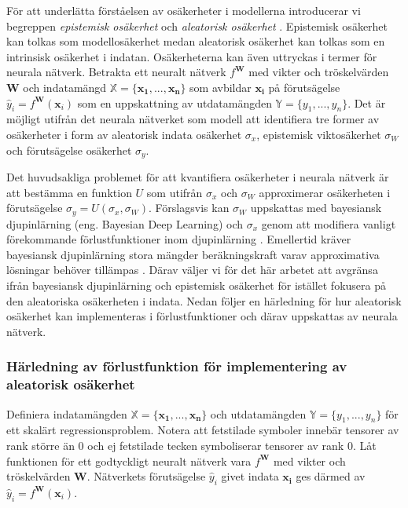 För att underlätta förståelsen av osäkerheter i modellerna introducerar vi begreppen \emph{epistemisk osäkerhet} och \emph{aleatorisk osäkerhet} \cite{Uncert}. Epistemisk osäkerhet kan tolkas som modellosäkerhet medan aleatorisk osäkerhet kan tolkas som en intrinsisk osäkerhet i indatan. Osäkerheterna kan även uttryckas i termer för neurala nätverk. Betrakta ett neuralt nätverk $f^\mathbf{W}$ med vikter och tröskelvärden $\mathbf{W}$ och indatamängd $\mathbb{X} = \{\mathbf{x_1},..., \mathbf{x_n}\}$ som avbildar $\mathbf{x_i}$ på förutsägelse $\hat{y}_i = f^\mathbf{W}(\mathbf{x}_i)$ som en uppskattning av utdatamängden $\mathbb{Y} = \{y_1,..., y_n\}$. Det är möjligt utifrån det neurala nätverket som modell att identifiera tre former av osäkerheter i form av aleatorisk indata osäkerhet $\sigma_x$, epistemisk viktosäkerhet $\sigma_W$ och förutsägelse osäkerhet $\sigma_y$.

Det huvudsakliga problemet för att kvantifiera osäkerheter i neurala nätverk är att bestämma en funktion $U$ som utifrån $\sigma_x$ och $\sigma_W$ approximerar osäkerheten i förutsägelse $\sigma_y = U(\sigma_x, \sigma_W)$. Förslagsvis kan $\sigma_W$ uppskattas med bayesiansk djupinlärning (eng. Bayesian Deep Learning) och $\sigma_x$ genom att modifiera vanligt förekommande förlustfunktioner inom djupinlärning \cite{Kendall-Gal}. Emellertid kräver bayesiansk djupinlärning stora mängder beräkningskraft varav approximativa lösningar behöver tillämpas \cite{MC-dropout}. Därav väljer vi för det här arbetet att avgränsa ifrån bayesiansk djupinlärning och epistemisk osäkerhet för istället fokusera på den aleatoriska osäkerheten i indata. Nedan följer en härledning för hur aleatorisk osäkerhet kan implementeras i förlustfunktioner och därav uppskattas av neurala nätverk.

\subsubsection{Härledning av förlustfunktion för implementering av aleatorisk osäkerhet}
Definiera indatamängden $\mathbb{X} = \{\mathbf{x_1},..., \mathbf{x_n}\}$ och utdatamängden $\mathbb{Y} = \{y_1,..., y_n\}$ för ett skalärt regressionsproblem. Notera att fetstilade symboler innebär tensorer av rank större än 0 och ej fetstilade tecken symboliserar tensorer av rank 0.  Låt funktionen för ett godtyckligt neuralt nätverk vara $f^\mathbf{W}$ med vikter och tröskelvärden $\mathbf{W}$. Nätverkets förutsägelse $\hat{y}_i$ givet indata $\mathbf{x_i}$ ges därmed av $\hat{y}_i = f^\mathbf{W}(\mathbf{x}_i)$.

